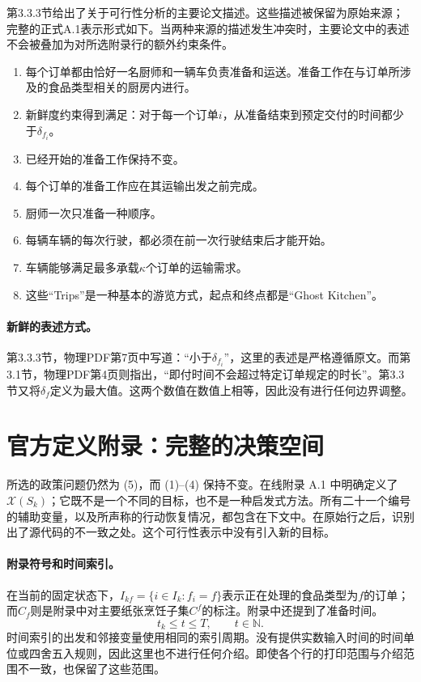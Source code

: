 \documentclass{article}
\begin{document}
第3.3.3节给出了关于可行性分析的主要论文描述。这些描述被保留为原始来源；完整的正式A.1表示形式如下。当两种来源的描述发生冲突时，主要论文中的表述不会被叠加为对所选附录行的额外约束条件。
\begin{enumerate}
\item 每个订单都由恰好一名厨师和一辆车负责准备和运送。准备工作在与订单所涉及的食品类型相关的厨房内进行。
\item 新鲜度约束得到满足：对于每一个订单\(i\)，从准备结束到预定交付的时间都少于\(\delta_{f_i}\)。
\item 已经开始的准备工作保持不变。
\item 每个订单的准备工作应在其运输出发之前完成。
\item 厨师一次只准备一种顺序。
\item 每辆车辆的每次行驶，都必须在前一次行驶结束后才能开始。
\item 车辆能够满足最多承载\(\kappa\)个订单的运输需求。
\item 这些“Trips”是一种基本的游览方式，起点和终点都是“Ghost Kitchen”。
\end{enumerate}

\paragraph{新鲜的表述方式。}
第3.3.3节，物理PDF第7页中写道：“小于\(\delta_{f_i}\)”，这里的表述是严格遵循原文。而第3.1节，物理PDF第4页则指出，“即付时间不会超过特定订单规定的时长”。第3.3节又将\(\delta_f\)定义为最大值。这两个数值在数值上相等，因此没有进行任何边界调整。

\section*{官方定义附录：完整的决策空间}

所选的政策问题仍然为 (5)，而 (1)–(4) 保持不变。在线附录 A.1 中明确定义了 \(\mathcal X(S_k)\)；它既不是一个不同的目标，也不是一种启发式方法。所有二十一个编号的辅助变量，以及所声称的行动恢复情况，都包含在下文中。在原始行之后，识别出了源代码的不一致之处。这个可行性表示中没有引入新的目标。

\paragraph{附录符号和时间索引。}
在当前的固定状态下，\(I_{kf}=\{i\in I_k:f_i=f\}\)表示正在处理的食品类型为\(f\)的订单；而\(C_f\)则是附录中对主要纸张烹饪子集\(C^f\)的标注。附录中还提到了准备时间。
\[
t_k\leq t\leq T,\qquad t\in\mathbb N.
\]
时间索引的出发和邻接变量使用相同的索引周期。没有提供实数输入时间的时间单位或四舍五入规则，因此这里也不进行任何介绍。即使各个行的打印范围与介绍范围不一致，也保留了这些范围。
\end{document}
